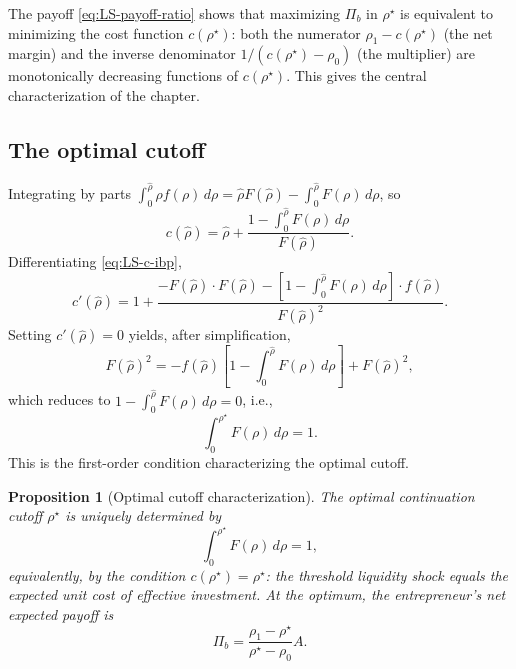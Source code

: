 \documentclass[11pt,a4paper,oneside]{book}
\theoremstyle{plain}
\newtheorem{proposition}[theorem]{Proposition}
\theoremstyle{definition}
\theoremstyle{remark}
\numberwithin{equation}{chapter}
\begin{document}
The payoff \eqref{eq:LS-payoff-ratio} shows that maximizing $\Pi_b$ in $\rho^\star$ is equivalent to minimizing the cost function $c(\rho^\star)$: both the numerator $\rho_1 - c(\rho^\star)$ (the net margin) and the inverse denominator $1/(c(\rho^\star) - \rho_0)$ (the multiplier) are monotonically decreasing functions of $c(\rho^\star)$.
This gives the central characterization of the chapter.

\subsection{The optimal cutoff}

Integrating by parts $\int_0^{\widehat{\rho}} \rho f(\rho) \, d\rho = \widehat{\rho} F(\widehat{\rho}) - \int_0^{\widehat{\rho}} F(\rho) \, d\rho$, so
\begin{equation}\label{eq:LS-c-ibp}
  c(\widehat{\rho}) = \widehat{\rho} + \frac{1 - \int_0^{\widehat{\rho}} F(\rho) \, d\rho}{F(\widehat{\rho})}.
\end{equation}
Differentiating \eqref{eq:LS-c-ibp},
\begin{equation*}
  c'(\widehat{\rho}) = 1 + \frac{-F(\widehat{\rho}) \cdot F(\widehat{\rho}) - [1 - \int_0^{\widehat{\rho}} F(\rho) \, d\rho] \cdot f(\widehat{\rho})}{F(\widehat{\rho})^2}.
\end{equation*}
Setting $c'(\widehat{\rho}) = 0$ yields, after simplification,
\begin{equation*}
  F(\widehat{\rho})^2 = -f(\widehat{\rho}) \left[ 1 - \int_0^{\widehat{\rho}} F(\rho) \, d\rho \right] + F(\widehat{\rho})^2,
\end{equation*}
which reduces to $1 - \int_0^{\widehat{\rho}} F(\rho) \, d\rho = 0$, i.e.,
\begin{equation}\label{eq:LS-FOC}
  \int_0^{\rho^\star} F(\rho) \, d\rho = 1.
\end{equation}
This is the first-order condition characterizing the optimal cutoff.

\begin{proposition}[Optimal cutoff characterization]\label{prop:LS-FOC}
The optimal continuation cutoff $\rho^\star$ is uniquely determined by
\begin{equation*}
  \int_0^{\rho^\star} F(\rho) \, d\rho = 1,
\end{equation*}
equivalently, by the condition $c(\rho^\star) = \rho^\star$: the threshold liquidity shock equals the expected unit cost of effective investment.
At the optimum, the entrepreneur's net expected payoff is
\begin{equation}\label{eq:LS-Pi-optimum}
  \Pi_b = \frac{\rho_1 - \rho^\star}{\rho^\star - \rho_0} A.
\end{equation}
\end{proposition}
\end{document}
